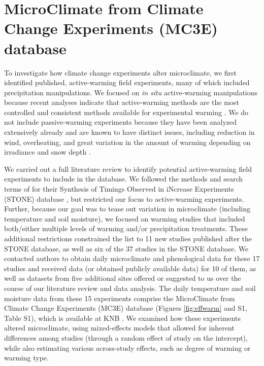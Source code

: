 \documentclass{article}
\begin{document}
\section* {MicroClimate from Climate Change Experiments (MC3E) database}
\par To investigate how climate change experiments alter microclimate, we first identified published, active-warming field experiments, many of which included precipitation manipulations. We focused on \textit{in situ} active-warming manipulations because recent analyses indicate that active-warming methods are the most controlled and consistent methods available for experimental warming \citep{kimball2005,kimball2008,aronson2009,wolkovich2012}. We do not include passive-warming experiments because they have been analyzed extensively already and are known to have distinct issues, including reduction in wind, overheating, and great variation in the amount of warming depending on irradiance and snow depth \citep[][see also Table S2]{marion1997,shaver2000,wolkovich2012,bokhorst2013}.
\par We carried out a full literature review to identify potential active-warming field experiments to include in the database. We followed the methods and search terms of \citet{wolkovich2012} for their Synthesis of Timings Observed in iNcrease Experiments (STONE) database \citep{wolkovich2012}, but restricted our focus to active-warming experiments. Further, because our goal was to tease out variation in microclimate (including temperature and soil moisture), we focused on warming studies that included both/either multiple levels of warming and/or precipitation treatments. These additional restrictions constrained the list to 11 new studies published after the STONE database, as well as six of the 37 studies in the STONE database. We contacted authors to obtain daily microclimate and phenological data for these 17 studies and received data (or obtained publicly available data) for 10 of them, as well as datasets from five additional sites offered or suggested to us over the course of our literature review and data analysis. The daily temperature and soil moisture data from these 15 experiments comprise the MicroClimate from Climate Change Experiments (MC3E) database (Figures \ref{fig:effwarm} and S1, Table S1), which is available at KNB \citep{ettinger2018}. We examined how these experiments altered microclimate, using mixed-effects models that allowed for inherent differences among studies (through a random effect of study on the intercept), while also estimating various across-study effects, such as degree of warming or warming type. 
\end{document}
